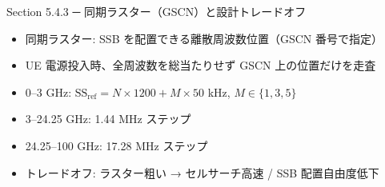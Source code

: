 \begin{frame}{Section 5.4.3 ─ 同期ラスター（GSCN）と設計トレードオフ}
\begin{itemize}
  \item 同期ラスター: SSB を配置できる離散周波数位置（GSCN 番号で指定）
  \item UE 電源投入時、全周波数を総当たりせず GSCN 上の位置だけを走査
  \item 0--3 GHz: $\mathrm{SS}_{\mathrm{ref}} = N \times 1200 + M \times 50$ kHz, $M \in \{1, 3, 5\}$
  \item 3--24.25 GHz: 1.44 MHz ステップ
  \item 24.25--100 GHz: 17.28 MHz ステップ
  \item トレードオフ: ラスター粗い → セルサーチ高速 / SSB 配置自由度低下
\end{itemize}
\end{frame}
